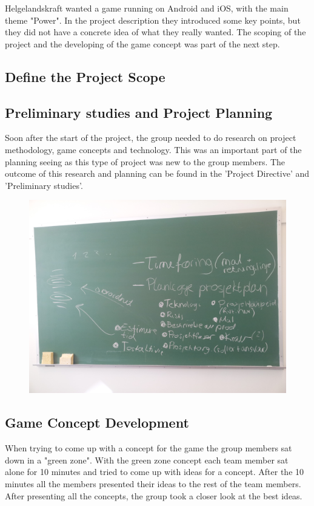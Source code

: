 	Helgelandskraft wanted a game running on Android and iOS, with the main theme "Power".
	In the project description they introduced some key points, but they did not have a
	concrete idea of what they really wanted. The scoping of the project and the developing
	of the game concept was part of the next step.

\subsection{Define the Project Scope}


\subsection{Preliminary studies and Project Planning}
	Soon after the start of the project, the group needed to do research on project methodology, 
	game concepts and technology. This was an important part of the planning seeing as this type of 
	project was new to the group members. The outcome of this research and planning can be found 
	in the 'Project Directive' and 'Preliminary studies'.

	\begin{figure}[H]
		\includegraphics[scale=0.10]{pictures/projectPlanning.jpg}
	\end{figure}

\subsection{Game Concept Development}
	
	When trying to come up with a concept for the game the group members sat down in a "green zone". 
	With the green zone concept each team member sat alone for 10 minutes and tried to come up with 
	ideas for a concept. After the 10 minutes all the members presented their ideas to the rest of 
	the team members. After presenting all the concepts, the group took a closer look at the best ideas. 

